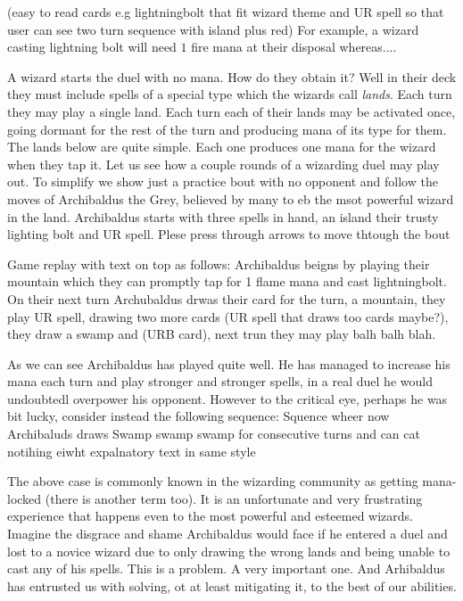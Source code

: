 \documentclass[
    a4paper,
    DIV=13,
    abstract=true,
    numbers=noenddot
]{scrartcl}
\begin{document}
(easy to read cards e.g lightningbolt that fit wizard theme and UR spell so that user can see two turn sequence with island plus red)
For example, a wizard casting lightning bolt will need $1$ fire mana at their disposal whereas....

A wizard starts the duel with no mana. How do they obtain it? Well in their deck they must include spells of a special type which the wizards call \emph{lands}. Each turn they may play a single land. Each turn each of their lands may be activated once, going dormant for the rest of the turn and producing mana of its type for them. The lands below are quite simple. Each one produces one mana for the wizard when they tap it. Let us see how a couple rounds of a wizarding duel may play out. To simplify we show just a practice bout with no opponent and follow the moves of Archibaldus the Grey, believed by many to eb the msot powerful wizard in the land.  Archibaldus starts with three spells in hand, an island their trusty lighting bolt and UR spell. Plese press through arrows to move thtough the bout

Game replay with text on top as follows: Archibaldus beigns by playing their mountain which they can promptly tap for 1 flame mana and cast lightningbolt. On their next turn Archubaldus drwas their card for the turn, a mountain, they play UR spell, drawing two more cards (UR spell that draws too cards maybe?), they draw a swamp and (URB card), next trun they may play balh balh blah.


As we can see Archibaldus has played quite well. He has managed to increase his mana each turn and play stronger and stronger spells, in a real duel he would undoubtedl overpower his opponent. However to the critical eye, perhaps he was bit lucky, consider instead the following sequence:
Squence wheer now Archibaluds draws Swamp swamp swamp for consecutive turns and can cat notihing eiwht expalnatory text in same style

The above case is commonly known in the wizarding community as getting mana-locked (there is another term too). It is an unfortunate and very frustrating experience that happens even to the most powerful and esteemed wizards. Imagine the disgrace and shame Archibaldus would face if he entered a duel and lost to a novice wizard due to only drawing the wrong lands and being unable to cast any of his spells. This is a problem. A very important one. And Arhibaldus has entrusted us with solving, ot at least mitigating it, to the best of our abilities.
\end{document}
